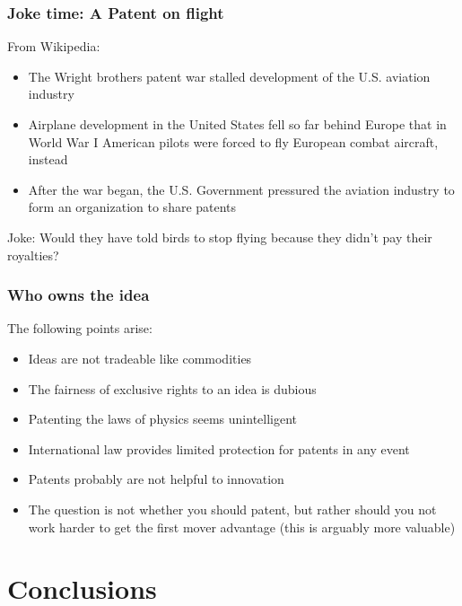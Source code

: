 \documentclass{beamer}
\begin{document}
\begin{frame}
\frametitle{Joke time:  A Patent on flight}

From Wikipedia:

\begin{itemize}
\item The Wright brothers patent war stalled development of the U.S. aviation industry 
\item Airplane development in the United States fell so far behind Europe that in World War I American pilots were forced to fly European combat aircraft, instead
\item After the war began, the U.S. Government pressured the aviation industry to form an organization to share patents
\end{itemize}

\begin{center}
Joke:  Would they have told birds to stop flying because they didn't pay their royalties?
\end{center}
\end{frame}


\begin{frame}
\frametitle{Who owns the idea}

\begin{center}

The following points arise:

\begin{itemize}
\item Ideas are not tradeable like commodities
\item The fairness of exclusive rights to an idea is dubious
\item Patenting the laws of physics seems unintelligent
\item International law provides limited protection for patents in any event
\item Patents probably are not helpful to innovation
\item The question is not whether you should patent, but rather should you not work harder to get the first mover advantage (this is arguably more valuable)
\end{itemize}

\end{center}
\end{frame}


\section{Conclusions}
\end{document}
